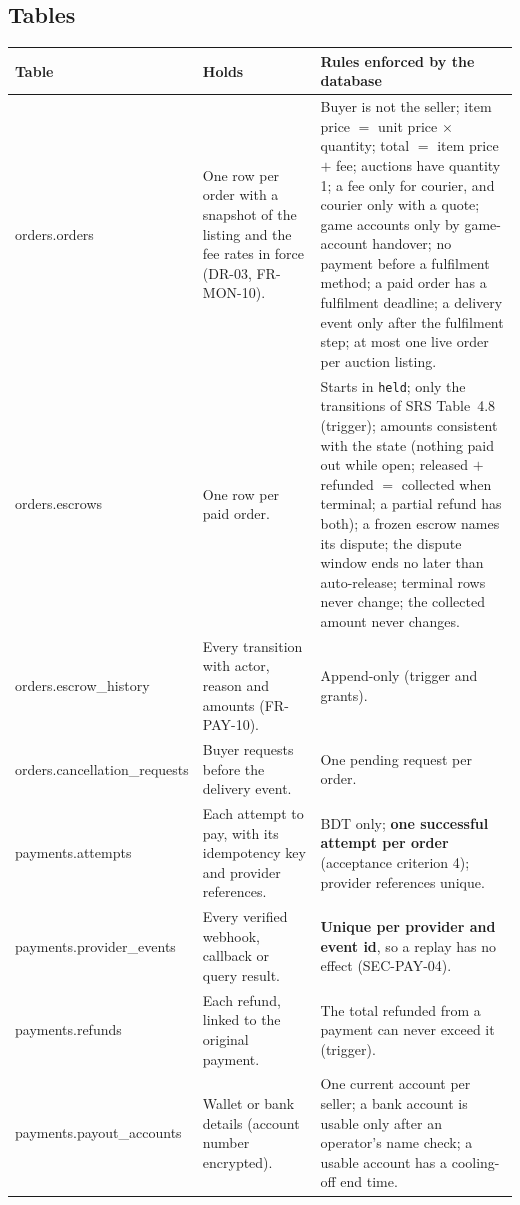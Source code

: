 \documentclass[11pt,a4paper]{article}
\newenvironment{dtable}[1]{\small\begin{longtable}{#1}}{\end{longtable}}
\begin{document}
\subsection{Tables}
\begin{dtable}{@{}>{\ttfamily\raggedright\arraybackslash}p{3.7cm}>{\raggedright\arraybackslash}p{4.9cm}>{\raggedright\arraybackslash}p{6.6cm}@{}}
\toprule
\textnormal{\textbf{Table}} & \textbf{Holds} & \textbf{Rules enforced by the database} \\ \midrule \endhead
orders.\allowbreak orders & One row per order with a snapshot of the listing and the fee rates in force (DR-03, FR-MON-10). & Buyer is not the seller; item price $=$ unit price $\times$ quantity; total $=$ item price $+$ fee; auctions have quantity 1; a fee only for courier, and courier only with a quote; game accounts only by game-account handover; no payment before a fulfilment method; a paid order has a fulfilment deadline; a delivery event only after the fulfilment step; at most one live order per auction listing. \\
orders.\allowbreak escrows & One row per paid order. & Starts in \texttt{held}; only the transitions of SRS Table~4.8 (trigger); amounts consistent with the state (nothing paid out while open; released $+$ refunded $=$ collected when terminal; a partial refund has both); a frozen escrow names its dispute; the dispute window ends no later than auto-release; terminal rows never change; the collected amount never changes. \\
orders.\allowbreak escrow\_history & Every transition with actor, reason and amounts (FR-PAY-10). & Append-only (trigger and grants). \\
orders.\allowbreak cancellation\_requests & Buyer requests before the delivery event. & One pending request per order. \\
payments.\allowbreak attempts & Each attempt to pay, with its idempotency key and provider references. & BDT only; \textbf{one successful attempt per order} (acceptance criterion 4); provider references unique. \\
payments.\allowbreak provider\_events & Every verified webhook, callback or query result. & \textbf{Unique per provider and event id}, so a replay has no effect (SEC-PAY-04). \\
payments.\allowbreak refunds & Each refund, linked to the original payment. & The total refunded from a payment can never exceed it (trigger). \\
payments.\allowbreak payout\_accounts & Wallet or bank details (account number encrypted). & One current account per seller; a bank account is usable only after an operator's name check; a usable account has a cooling-off end time. \\

\end{dtable}
\end{document}
